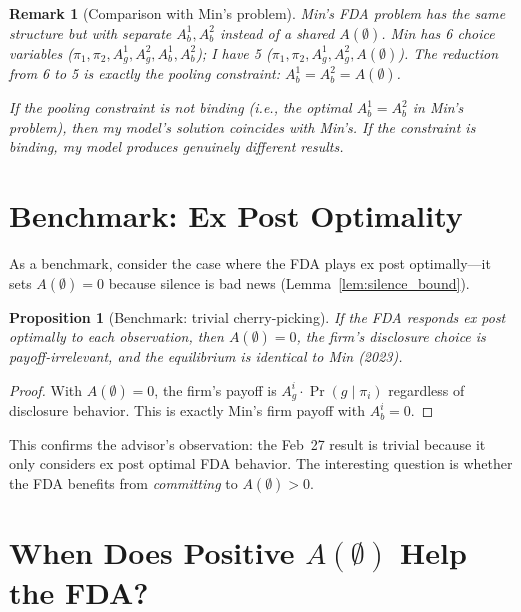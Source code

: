 \documentclass[12pt,a4paper]{article}
\newtheorem{proposition}{Proposition}
\newtheorem{remark}{Remark}
\begin{document}
\begin{remark}[Comparison with Min's problem]
Min's FDA problem has the same structure but with separate
$A_b^1, A_b^2$ instead of a shared $A(\emptyset)$. Min has
6 choice variables ($\pi_1, \pi_2, A_g^1, A_g^2, A_b^1,
A_b^2$); I have 5 ($\pi_1, \pi_2, A_g^1, A_g^2, A(\emptyset)$).
The reduction from 6 to 5 is exactly the pooling constraint:
$A_b^1 = A_b^2 = A(\emptyset)$.

If the pooling constraint is not binding (i.e., the optimal
$A_b^1 = A_b^2$ in Min's problem), then my model's solution
coincides with Min's. If the constraint is binding, my model
produces genuinely different results.
\end{remark}


\section{Benchmark: Ex Post Optimality}
\label{sec:benchmark}

As a benchmark, consider the case where the FDA plays ex post
optimally---it sets $A(\emptyset) = 0$ because silence is bad
news (Lemma~\ref{lem:silence_bound}).

\begin{proposition}[Benchmark: trivial cherry-picking]
\label{prop:benchmark}
If the FDA responds ex post optimally to each observation,
then $A(\emptyset) = 0$, the firm's disclosure choice is
payoff-irrelevant, and the equilibrium is identical to Min
(2023).
\end{proposition}

\begin{proof}
With $A(\emptyset) = 0$, the firm's payoff is
$A_g^i \cdot \Pr(g \mid \pi_i)$ regardless of disclosure
behavior. This is exactly Min's firm payoff with $A_b^i = 0$.
\end{proof}

This confirms the advisor's observation: the Feb~27 result is
trivial because it only considers ex post optimal FDA behavior.
The interesting question is whether the FDA benefits from
\emph{committing} to $A(\emptyset) > 0$.


\section{When Does Positive $A(\emptyset)$ Help the FDA?}
\label{sec:positive_A}
\end{document}
